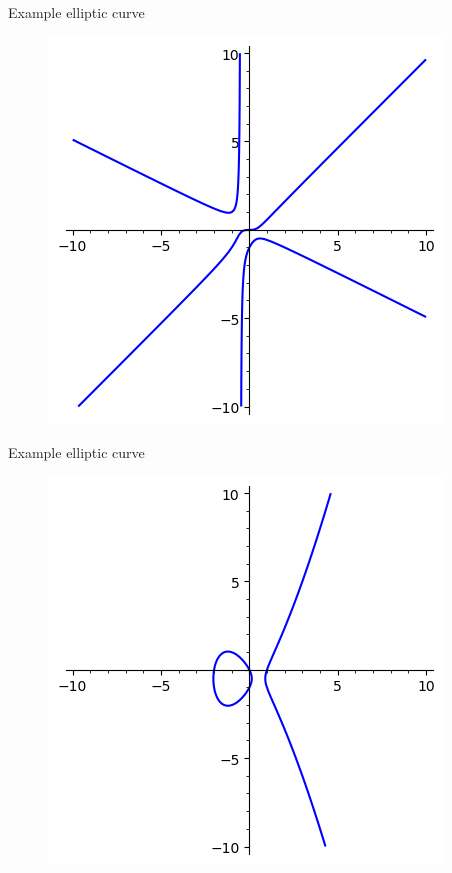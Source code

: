 \documentclass[aspectratio=169,xcolor=dvipsnames]{beamer}
\begin{document}
\begin{frame}{Example elliptic curve}
    \begin{figure}
        \centering
        \includegraphics[height=0.8\textheight]{elliptic-curve-07.png}
    \end{figure}
\end{frame}

\begin{frame}{Example elliptic curve}
    \begin{figure}
        \centering
        \includegraphics[height=0.8\textheight]{elliptic-curve-08.png}
    \end{figure}
\end{frame}
\end{document}
